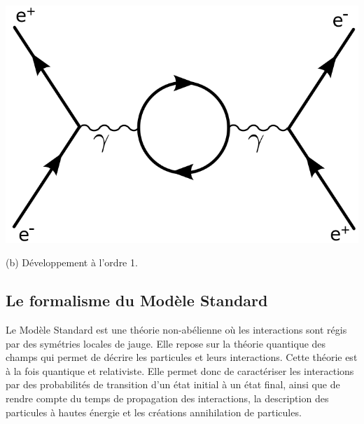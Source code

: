 {\begin{center}
\includegraphics[width=\marginparwidth]{SM/feyn3.png}
\begin{center}\normalfont\small {(b) Développement à l'ordre 1.}\end{center}
\label{feyn}
\end{center}
}
\subsection{Le formalisme du Modèle Standard}
Le Modèle Standard est une théorie non-abélienne où les interactions sont régis par des symétries locales de jauge. Elle repose sur la théorie quantique des champs qui permet de décrire les particules et leurs interactions. Cette théorie est à la fois quantique et relativiste. Elle permet donc de caractériser les interactions par des probabilités de transition d'un état initial à un état final, ainsi que de rendre compte du temps de propagation des interactions, la description des particules à hautes énergie et les créations annihilation de particules.

